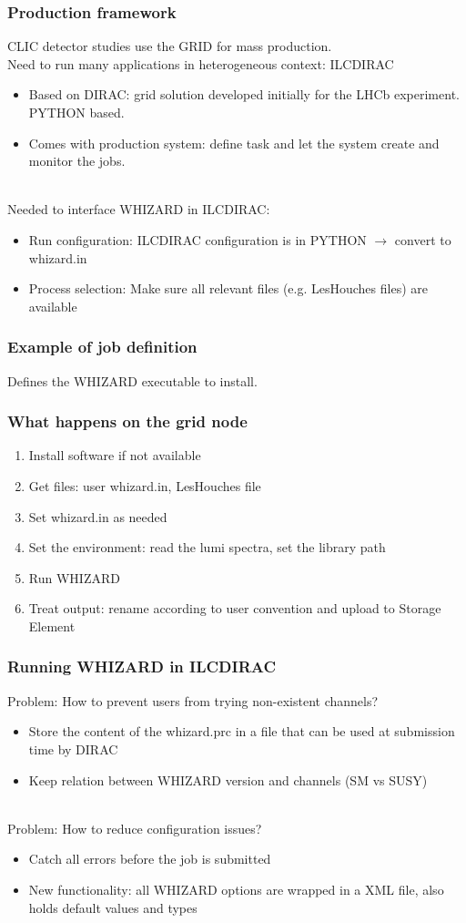 \documentclass{beamer}
\newcommand{\whizard}{WHIZARD\xspace}
\begin{document}
\begin{frame}
\frametitle{Production framework}
CLIC detector studies use the {\color{blue} GRID} for mass production.\\
Need to  run many applications in heterogeneous context: \alert{ILCDIRAC}
\begin{itemize}
  \item Based on DIRAC: grid solution developed initially for the LHCb
  experiment. {\color{blue}PYTHON} based.
  \item Comes with production system: define task and let the system create
  and monitor the jobs.
\end{itemize}
~\\
Needed to interface \whizard in ILCDIRAC:
\begin{itemize}
  \item Run configuration: ILCDIRAC configuration is in PYTHON $\to$ convert to
  whizard.in
  \item Process selection: Make sure all relevant files (e.g. LesHouches files)
  are available
\end{itemize}
\end{frame}
\begin{frame}
\frametitle{Example of job definition}

Defines the \whizard executable to install.
\end{frame}
\begin{frame}
\frametitle{What happens on the grid node}
\begin{enumerate}
  \item Install software if not available
  \item Get files: user whizard.in, LesHouches file
  \item Set whizard.in as needed
  \item Set the environment: read the lumi spectra, set the library path
  \item Run \whizard
  \item Treat output: rename according to user convention and upload to Storage
  Element
\end{enumerate}
\end{frame}
\begin{frame}
\frametitle{Running \whizard in ILCDIRAC}
Problem: How to prevent users from trying non-existent channels?
\begin{itemize}
  \item Store the content of the whizard.prc in a file that can be used at
  submission time by DIRAC
  \item Keep relation between \whizard version and channels (SM vs SUSY)
\end{itemize}
~\\
Problem: How to reduce configuration issues?
\begin{itemize}
  \item Catch all errors before the job is submitted	
  \item New functionality: all \whizard options are wrapped in a
  XML file, also holds default values and types
\end{itemize}
\end{frame}
\end{document}
